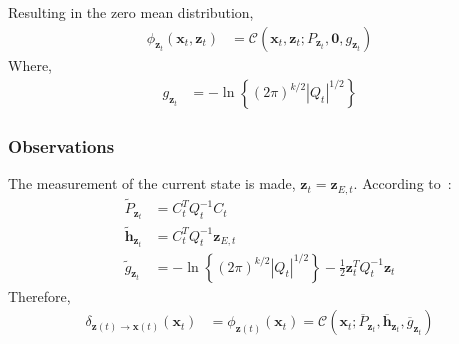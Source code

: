 Resulting in the zero mean distribution,
\begin{align}
\phi_{ \pmb{z}_{t} } ( \pmb{x}_{t}, \pmb{z}_{t} )&= \mathcal{C} \left( \pmb{x}_{t}, \pmb{z}_{t} ; P_{\pmb{z}_t}, \pmb{0} , g_{\pmb{z}_t} \right) 
\end{align}
Where,
\begin{align}
g_{\pmb{z}_{t}} &= - \ln{ \left\{ (2 \pi)^{k/2} | Q_{t} |^{1/2} \right\} }
\end{align}

\subsubsection{Observations}
\label{subsubsection:observations}
The measurement of the current state is made, $\pmb{z}_{t} = \pmb{z}_{E, t}$. According to~\cite{Koller_canonical}:
\begin{align}
\widetilde{P}_{\pmb{z}_{t}} &= C_{t}^{T} Q_{t}^{-1} C_{t} \\
\widetilde{\pmb{h}}_{\pmb{z}_{t}} &= C_{t}^{T} Q_{t}^{-1}  \pmb{z}_{E, t} \\
\widetilde{g}_{\pmb{z}_{t}} &= - \ln{ \left\{ (2 \pi)^{k/2} | Q_{t} |^{1/2} \right\} } - \frac{1}{2} \pmb{z}_{t}^{T} Q_{t}^{-1} \pmb{z}_{t}
\end{align}
Therefore,
\begin{align}
\delta_{\pmb{z}(t) \rightarrow \pmb{x}(t)} (\pmb{x}_{t}) &= \phi_{ \pmb{z}(t) } ( \pmb{x}_{t} ) = \mathcal{C} \left( \pmb{x}_{t}; \overline{P}_{\pmb{z}_{t}}, \overline{\pmb{h}}_{\pmb{z}_{t}} , \overline{g}_{\pmb{z}_{t}}  \right) 
\end{align}

